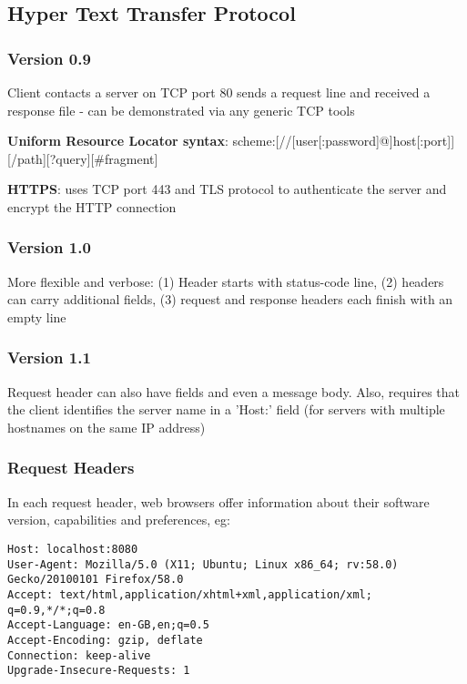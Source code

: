 \documentclass{article}
\begin{document}
\subsection{Hyper Text Transfer Protocol}
\subsubsection{Version 0.9}
Client contacts a server on TCP port 80 sends a request line and received a response file - can be demonstrated via any generic TCP tools

\bigskip
\noindent
\textbf{Uniform Resource Locator syntax}: scheme:[//[user[:password]@]host[:port]][/path][?query][$\#$fragment]

\bigskip
\noindent
\textbf{HTTPS}: uses TCP port 443 and TLS protocol to authenticate the server and encrypt the HTTP connection

\subsubsection{Version 1.0}
More flexible and verbose: (1) Header starts with status-code line, (2) headers can carry additional fields, (3) request and response headers each finish with an empty line

\subsubsection{Version 1.1}
Request header can also have fields and even a message body. Also, requires that the client identifies the server name in a 'Host:' field (for servers with multiple hostnames on the same IP address)

\subsubsection{Request Headers}
In each request header, web browsers offer information about their software version, capabilities and preferences, eg:
\begin{lstlisting}
Host: localhost:8080
User-Agent: Mozilla/5.0 (X11; Ubuntu; Linux x86_64; rv:58.0) Gecko/20100101 Firefox/58.0
Accept: text/html,application/xhtml+xml,application/xml; q=0.9,*/*;q=0.8
Accept-Language: en-GB,en;q=0.5
Accept-Encoding: gzip, deflate
Connection: keep-alive
Upgrade-Insecure-Requests: 1
\end{lstlisting}
\end{document}
